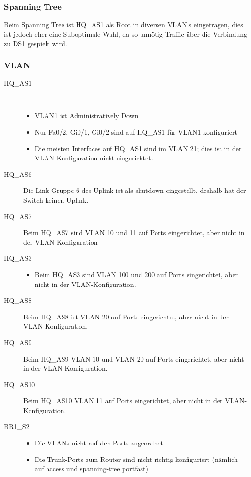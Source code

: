\subsubsection{Spanning Tree}
Beim Spanning Tree ist HQ\_AS1 als Root in diversen VLAN's eingetragen, dies ist jedoch eher eine Suboptimale Wahl, da so unnötig Traffic über die Verbindung zu DS1 gespielt wird.

\subsubsection{VLAN}
\begin{description}
	\item[HQ\_AS1] \hfill \\
	  \begin{itemize}
		  \item VLAN1 ist Administratively Down
		  \item Nur Fa0/2, Gi0/1, Gi0/2 sind auf HQ\_AS1 für VLAN1 konfiguriert
		  \item Die meisten Interfaces auf HQ\_AS1 sind im VLAN 21; dies ist in  der VLAN Konfiguration nicht eingerichtet.
	  \end{itemize}
	\item[HQ\_AS6] Die Link-Gruppe 6 des Uplink ist als shutdown eingestellt, deshalb hat der Switch keinen Uplink.
	\item[HQ\_AS7] Beim HQ\_AS7 sind VLAN 10 und 11 auf Ports eingerichtet, aber nicht in der VLAN-Konfiguration
	\item[HQ\_AS3] \hfill 
	\begin{itemize}
		\item Beim HQ\_AS3 sind VLAN 100 und 200 auf Ports eingerichtet, aber nicht in der VLAN-Konfiguration.
	\end{itemize}
	\item[HQ\_AS8] Beim HQ\_AS8 ist VLAN 20 auf Ports eingerichtet, aber nicht in der VLAN-Konfiguration.
	\item[HQ\_AS9] Beim HQ\_AS9 VLAN 10 und VLAN 20 auf Ports eingerichtet, aber nicht in der VLAN-Konfiguration.
	\item[HQ\_AS10] Beim HQ\_AS10 VLAN 11 auf Ports eingerichtet, aber nicht in der VLAN-Konfiguration.
	\item[BR1\_S2] \hfill
	  \begin{itemize} 
		  \item Die VLANs nicht auf den Ports zugeordnet.
		  \item Die Trunk-Ports zum Router sind nicht richtig konfiguriert (nämlich auf access und spanning-tree portfast)

\end{itemize}
\end{description}
